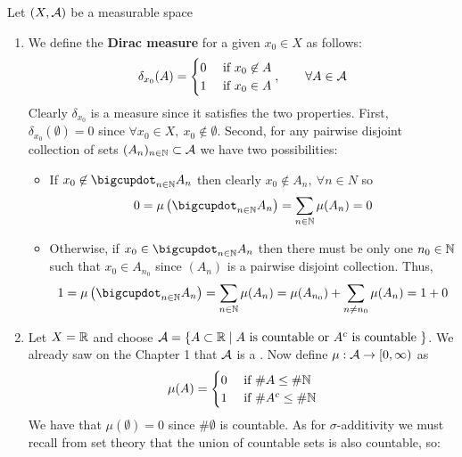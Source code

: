 \newcommand{\tif}{&\text{ if }}
\newcommand{\Pro}{\mathbb{P}}
\begin{eg}
	Let $(X, \mathcal{A})$ be a measurable space
	\begin{enumerate}
		\item We define the \textbf{Dirac measure} for a given $x_0 \in X$ as follows:
		\begin{align*}
			\delta_{x_0}(A) = \begin{cases}
			0 \tif x_0\not\in A \\
			1 \tif x_0 \in A
			\end{cases},\qquad \forall A \in \sa
		\end{align*}
		Clearly $\delta_{x_0}$ is a measure since it satisfies the two properties. First, $\delta_{x_0}(\emptyset) = 0$ since $\forall x_0 \in X,\ x_0 \not\in \emptyset$. Second, for any pairwise disjoint collection of sets $(A_n)_{n\in\mathbb{N}} \subset \mathcal{A}$ we have two possibilities:
		\begin{itemize}
			\item If $x_0 \not\in \bigcupdot_{n \in \N} A_n$ then clearly $x_0 \not\in A_n,\ \forall n \in N$ so
			\begin{align*}
				0 = \mu\left(\bigcupdot_{n \in \N} A_n\right) = \sum_{n\in \N} \mu(A_n) = 0
			\end{align*}
			\item Otherwise, if $x_0 \in \bigcupdot_{n \in \N} A_n$ then there must be only one $n_0 \in \mathbb{N}$ such that $x_0 \in A_{n_0}$ since $(A_n)$ is a pairwise disjoint collection. Thus,
			\begin{align*}
				1 = \mu\left(\bigcupdot_{n \in \N} A_n\right) = \sum_{n\in \N} \mu(A_n) = \mu(A_{n_0}) + \sum_{n \neq n_0} \mu(A_n) = 1 + 0
			\end{align*}
		\end{itemize}
	\item Let $X = \mathbb{R}$ and choose $\mathcal{A} = \{A \subset \mathbb{R} \mid A\text{ is countable or } A^c \text{ is countable }\}$. We already saw on the Chapter 1 that $\mathcal{A}$ is a \siga. Now define $\mu:\mathcal{A} \to [0, \infty)$ as
	\begin{align*}
		\mu(A) = \begin{cases}
		0 \tif \# A \leq \# \N \\
		1 \tif \# A^\complement \leq \# \N
		\end{cases}
	\end{align*}
	We have that $\mu(\emptyset) = 0$ since $\#\emptyset$ is countable. As for $\sigma$-additivity we must recall from set theory that the union of countable sets is also countable, so:

\end{enumerate}
\end{eg}
